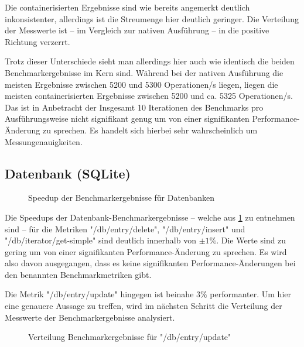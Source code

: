 Die containerisierten Ergebnisse sind wie bereits angemerkt deutlich inkonsistenter, allerdings ist die Streumenge hier deutlich geringer. Die Verteilung der Messwerte ist – im Vergleich zur nativen Ausführung – in die positive Richtung verzerrt. 

Trotz dieser Unterschiede sieht man allerdings hier auch wie identisch die beiden Benchmarkergebnisse im Kern sind. Während bei der nativen Ausführung die meisten Ergebnisse zwischen 5200 und 5300 Operationen/s liegen, liegen die meisten containerisierten Ergebnisse zwischen 5200 und ca. 5325 Operationen/s. Das ist in Anbetracht der Insgesamt 10 Iterationen des Benchmarks pro Ausführungsweise nicht signifikant genug um von einer signifikanten Performance-Änderung zu sprechen. Es handelt sich hierbei sehr wahrscheinlich um Messungenauigkeiten. 


\subsection{Datenbank (SQLite)}

\begin{figure}[H]
    \centering
    
    \caption{Speedup der Benchmarkergebnisse für Datenbanken}
    \label{fig:speedup_db}
\end{figure}

\FloatBarrier

Die Speedups der Datenbank-Benchmarkergebnisse – welche aus \cref{fig:speedup_db} zu entnehmen sind – für die Metriken "/db/entry/delete", "/db/entry/insert" und "/db/iterator/get-simple" sind deutlich innerhalb von $\pm 1\%$. Die Werte sind zu gering um von einer signifikanten Performance-Änderung zu sprechen. Es wird also davon ausgegangen, dass es keine signifikanten Performance-Änderungen bei den benannten Benchmarkmetriken gibt.

Die Metrik "/db/entry/update" hingegen ist beinahe $3\%$ performanter. Um hier eine genauere Aussage zu treffen, wird im nächsten Schritt die Verteilung der Messwerte der Benchmarkergebnisse analysiert.

\begin{figure}[H]
    \centering
    
    \caption{Verteilung Benchmarkergebnisse für "/db/entry/update"}
    \label{fig:mdist_db_entry_update}
\end{figure}

